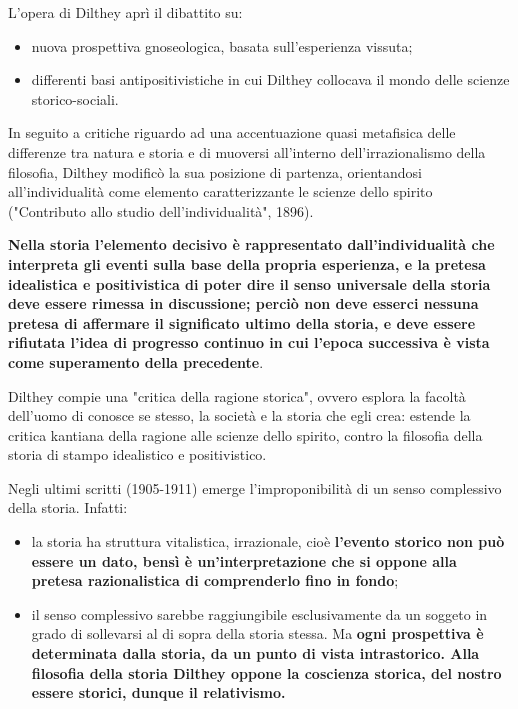 L'opera di Dilthey aprì il dibattito su:

\begin{itemize}
	\item nuova prospettiva gnoseologica, basata sull'esperienza vissuta;
	\item differenti basi antipositivistiche  in cui Dilthey collocava il mondo delle scienze storico-sociali.
\end{itemize}  

In seguito a critiche riguardo ad una accentuazione quasi metafisica delle differenze tra natura e storia e di muoversi all'interno dell'irrazionalismo della filosofia, Dilthey modificò la sua posizione di partenza, orientandosi all'individualità come elemento caratterizzante le scienze dello spirito ("Contributo allo studio dell'individualità", 1896).

\textbf{Nella storia l'elemento decisivo è rappresentato dall'individualità che interpreta gli eventi sulla base della propria esperienza, e la pretesa idealistica e positivistica di poter dire il senso universale della storia deve essere rimessa in discussione; perciò non deve esserci nessuna pretesa di affermare il significato ultimo della storia, e deve essere rifiutata l'idea di progresso continuo in cui l'epoca successiva è vista come superamento della precedente}.

Dilthey compie una "critica della ragione storica", ovvero esplora la facoltà dell'uomo di conosce se stesso, la società e la storia che egli crea: estende la critica kantiana della ragione alle scienze dello spirito, contro la filosofia della storia di stampo idealistico e positivistico.

Negli ultimi scritti (1905-1911) emerge l'improponibilità di un senso complessivo della storia. Infatti:

\begin{itemize}
	\item la storia ha struttura vitalistica, irrazionale, cioè \textbf{l'evento storico non può essere un dato, bensì è un'interpretazione che si oppone alla pretesa razionalistica di comprenderlo fino in fondo};
	\item il senso complessivo sarebbe raggiungibile esclusivamente da un soggeto in grado di sollevarsi al di sopra della storia stessa. Ma \textbf{ogni prospettiva è determinata dalla storia, da un punto di vista intrastorico. Alla filosofia della storia Dilthey oppone la coscienza storica, del nostro essere storici, dunque il relativismo.}
\end{itemize} 

